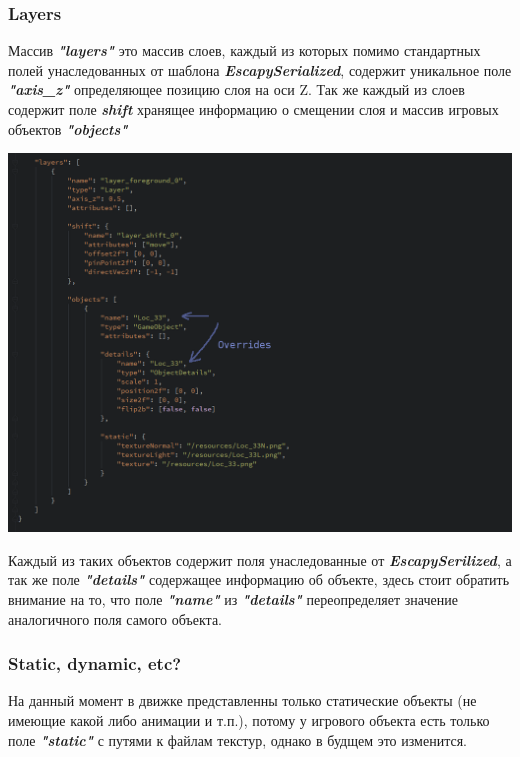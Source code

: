 \documentclass[11pt]{report}
\begin{document}
\subsubsection{Layers}
Массив \textit{\textbf{"layers"}} это массив слоев, каждый из которых помимо стандартных полей унаследованных от шаблона \textit{\textbf{EscapySerialized}}, содержит уникальное поле \textit{\textbf{"axis\_z"}} определяющее позицию слоя на оси Z. Так же каждый из слоев содержит поле \textit{\textbf{shift}} хранящее информацию о смещении слоя и массив игровых объектов \textit{\textbf{"objects"}}
\begin{center}
	\includegraphics[width=1.2\linewidth]{img/20.png} 
  	\label{img:200} 
\end{center} 
Каждый из таких объектов содержит поля унаследованные от \textit{\textbf{EscapySerilized}}, а так же поле \textit{\textbf{"details"}} содержащее информацию об объекте, здесь стоит обратить внимание на то, что поле \textit{\textbf{"name"}} из \textit{\textbf{"details"}} переопределяет значение аналогичного поля самого объекта.
\subsubsection{Static, dynamic, etc?}
На данный момент в движке представленны только статические объекты (не имеющие какой либо анимации и т.п.), потому у игрового объекта есть только поле \textit{\textbf{"static"}} с путями к файлам текстур, однако в будщем это изменится.
\newpage
\end{document}
